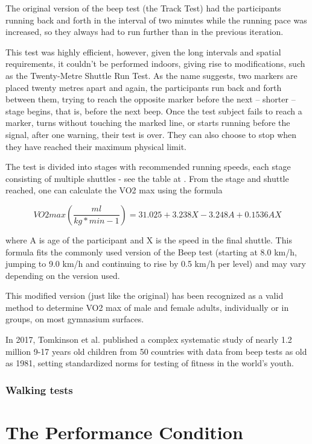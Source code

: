 The original version of the beep test (the Track Test) had the participants running back and forth in the interval of two minutes while the running pace was increased, so they always had to run further than in the previous iteration.

This test was highly efficient, however, given the long intervals and spatial requirements, it couldn't be performed indoors, giving rise to modifications, such as the Twenty-Metre Shuttle Run Test.
As the name suggests, two markers are placed twenty metres apart and again, the participants run back and forth between them, trying to reach the opposite marker before the next -- shorter -- stage begins, that is, before the next beep.
Once the test subject fails to reach a marker, turns without touching the marked line, or starts running before the signal, after one warning, their test is over.
They can also choose to stop when they have reached their maximum physical limit.

The test is divided into stages with recommended running speeds, each stage consisting of multiple shuttles - see the table at \cite{beep-test-scoring-table}.
From the stage and shuttle reached, one can calculate the VO2 max using the formula

\[VO2max (\frac{ml}{kg*min-1}) = 31.025 + 3.238X - 3.248A + 0.1536AX\]

where A is age of the participant and X is the speed in the final shuttle.
This formula fits the commonly used version of the Beep test (starting at 8.0 km/h, jumping to 9.0 km/h and continuing to rise by 0.5 km/h per level) and may vary depending on the version used.\cite{beep-test-versions}\cite{beep-test-20m-valid}

This modified version (just like the original) has been recognized as a valid method to determine VO2 max of male and female adults, individually or in groups, on most gymnasium surfaces.\cite{beep-test-20m-valid}

In 2017, Tomkinson et al. published a complex systematic study of nearly 1.2 million 9-17 years old children from 50 countries with data from beep tests as old as 1981,
setting standardized norms for testing of fitness in the world's youth.\cite{beep-test-youth-large-study}


\subsubsection*{Walking tests}

\section{The Performance Condition}

